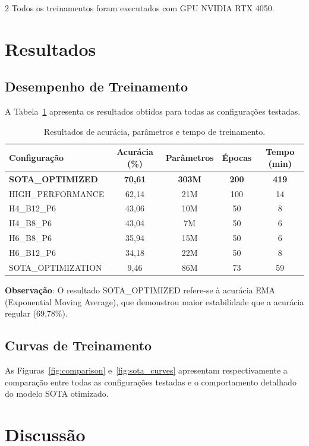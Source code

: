 \documentclass[conference]{IEEEtran}
\begin{document}
\begin{multicols}{2}
Todos os treinamentos foram executados com GPU NVIDIA RTX 4050.

\section{Resultados}

\subsection{Desempenho de Treinamento}
A Tabela~\ref{tab:acc} apresenta os resultados obtidos para todas as configurações testadas.

\begin{table}[H]
\centering
\caption{Resultados de acurácia, parâmetros e tempo de treinamento.}
\label{tab:acc}
\begin{tabular}{@{}lcccc@{}}
\toprule
\textbf{Configuração} & \textbf{Acurácia (\%)} & \textbf{Parâmetros} & \textbf{Épocas} & \textbf{Tempo (min)} \\ \midrule
\textbf{SOTA\_OPTIMIZED} & \textbf{70,61} & \textbf{303M} & \textbf{200} & \textbf{419} \\
HIGH\_PERFORMANCE & 62,14 & 21M & 100 & 14 \\
H4\_B12\_P6 & 43,06 & 10M & 50 & 8 \\
H4\_B8\_P6 & 43,04 & 7M & 50 & 6 \\
H6\_B8\_P6 & 35,94 & 15M & 50 & 6 \\
H6\_B12\_P6 & 34,18 & 22M & 50 & 8 \\
SOTA\_OPTIMIZATION & 9,46 & 86M & 73 & 59 \\ \bottomrule
\end{tabular}
\end{table}

\textbf{Observação}: O resultado SOTA\_OPTIMIZED refere-se à acurácia EMA (Exponential Moving Average), que demonstrou maior estabilidade que a acurácia regular (69,78\%).

\subsection{Curvas de Treinamento}
As Figuras~\ref{fig:comparison} e~\ref{fig:sota_curves} apresentam respectivamente a comparação entre todas as configurações testadas e o comportamento detalhado do modelo SOTA otimizado.

\section{Discussão}


\end{multicols}
\end{document}
